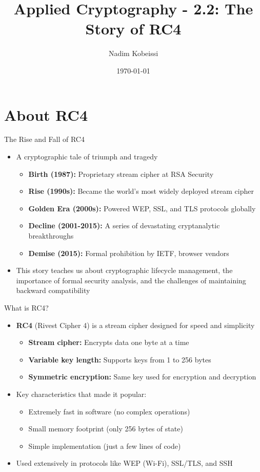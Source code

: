 \documentclass[aspectratio=169, lualatex, handout]{beamer}
\title{Applied Cryptography - 2.2: The Story of RC4}
\author{Nadim Kobeissi}
\institute{American University of Beirut}
\date{\today}
\begin{document}
\begin{frame}[plain]
	\titlepage
\end{frame}

\section{About RC4}

\begin{frame}{The Rise and Fall of RC4}
	\begin{itemize}[<+->]
		\item A cryptographic tale of triumph and tragedy
		      \begin{itemize}[<+->]
			      \item \textbf{Birth (1987):} Proprietary stream cipher at RSA Security
			      \item \textbf{Rise (1990s):} Became the world's most widely deployed stream cipher
			      \item \textbf{Golden Era (2000s):} Powered WEP, SSL, and TLS protocols globally
			      \item \textbf{Decline (2001-2015):} A series of devastating cryptanalytic breakthroughs
			      \item \textbf{Demise (2015):} Formal prohibition by IETF, browser vendors
		      \end{itemize}
		\item This story teaches us about cryptographic lifecycle management, the importance of formal security analysis, and the challenges of maintaining backward compatibility
	\end{itemize}
\end{frame}

\begin{frame}{What is RC4?}
	\begin{itemize}[<+->]
		\item \textbf{RC4} (Rivest Cipher 4) is a stream cipher designed for speed and simplicity
		      \begin{itemize}[<+->]
			      \item \textbf{Stream cipher:} Encrypts data one byte at a time
			      \item \textbf{Variable key length:} Supports keys from 1 to 256 bytes
			      \item \textbf{Symmetric encryption:} Same key used for encryption and decryption
		      \end{itemize}
		\item Key characteristics that made it popular:
		      \begin{itemize}[<+->]
			      \item Extremely fast in software (no complex operations)
			      \item Small memory footprint (only 256 bytes of state)
			      \item Simple implementation (just a few lines of code)
		      \end{itemize}
		\item Used extensively in protocols like WEP (Wi-Fi), SSL/TLS, and SSH
	\end{itemize}
\end{frame}
\end{document}
